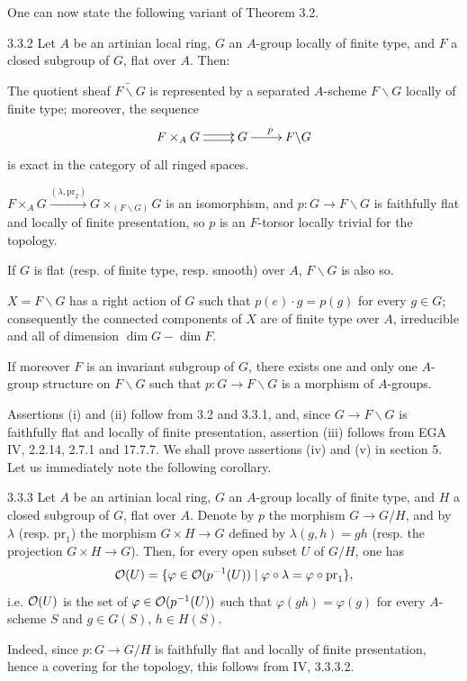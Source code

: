 One can now state the following variant of Theorem 3.2.
\begin{theorem}{3.3.2}\label{VIA.3.3.2}
Let $A$ be an artinian local ring, $G$ an $A$-group locally of finite type, and $F$ a closed subgroup of $G$, flat over $A$. Then:
\begin{enumeratei}
\item The quotient \fppf sheaf $\widetilde{F\backslash G}$ is represented by a separated $A$-scheme $F\backslash G$ locally of finite type; moreover, the sequence
\[
\xymatrix{F\times_AG\ar@<.5ex>[r]\ar@<-.5ex>[r]&G\ar[r]^p&F\backslash G}
\]
is exact in the category of all ringed spaces.
\item $F\times_AG\xrightarrow{(\lambda,\mathrm{pr}_2)}G\times_{(F\backslash G)}G$ is an isomorphism, and $p:G\to F\backslash G$ is faithfully flat and locally of finite presentation, so $p$ is an $F$-torsor locally trivial for the \fppf topology.
\item If $G$ is flat (resp. of finite type, resp. smooth) over $A$, $F\backslash G$ is also so.
\item $X=F\backslash G$ has a right action of $G$ such that $p(e)\cdot g=p(g)$ for every $g\in G$; consequently the connected components of $X$ are of finite type over $A$, irreducible and all of dimension $\dim G-\dim F$.
\item If moreover $F$ is an invariant subgroup of $G$, there exists one and only one $A$-group structure on $F\backslash G$ such that $p:G\to F\backslash G$ is a morphism of $A$-groups.
\end{enumeratei}
\end{theorem}
Assertions (i) and (ii) follow from 3.2 and 3.3.1, and, since $G\to F\backslash G$ is faithfully flat and locally of finite presentation, assertion (iii) follows from EGA IV, 2.2.14, 2.7.1 and 17.7.7. We shall prove assertions (iv) and (v) in section 5. Let us immediately note the following corollary.
\begin{corollary}{3.3.3}\label{VIA.3.3.3}
Let $A$ be an artinian local ring, $G$ an $A$-group locally of finite type, and $H$ a closed subgroup of $G$, flat over $A$. Denote by $p$ the morphism $G\to G/H$, and by $\lambda$ (resp. $\mathrm{pr}_1$) the morphism $G\times H\to G$ defined by $\lambda(g,h)=gh$ (resp. the projection $G\times H\to G$). Then, for every open subset $U$ of $G/H$, one has
\[
\mathcal{O}(U)=\{\varphi\in\mathcal{O}(p^{-1}(U))\mid\varphi\circ\lambda=\varphi\circ\mathrm{pr}_1\},
\]
i.e. $\mathcal{O}(U)$ is the set of $\varphi\in\mathcal{O}(p^{-1}(U))$ such that $\varphi(gh)=\varphi(g)$ for every $A$-scheme $S$ and $g\in G(S)$, $h\in H(S)$.
\end{corollary}
Indeed, since $p:G\to G/H$ is faithfully flat and locally of finite presentation, hence a covering for the \fppf topology, this follows from IV, 3.3.3.2.

